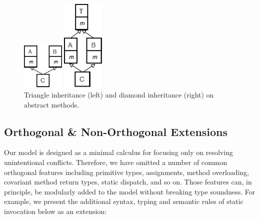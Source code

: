 \begin{figure}[t]
    \centering
    \begin{minipage}[t]{0.45\textwidth}
        \centering
        \includegraphics[width=2cm]{pics/P7.pdf}
    \end{minipage}
    \centering
    \hspace*{2pt}
    \begin{minipage}[t]{0.45\textwidth}
        \centering
        \includegraphics[width=2cm]{pics/P8.pdf}
    \end{minipage}  
    \caption{Triangle inheritance (left) and diamond inheritance (right) on abstract methods.}\label{fig:abstractdiamond}
\end{figure}

\subsection{Orthogonal \& Non-Orthogonal Extensions}\label{sec:orthoext}

Our model is designed as a minimal calculus for focusing only on resolving unintentional conflicts. Therefore, we have omitted a number of
common orthogonal features including primitive types, assignments, method overloading, covariant method return types, static dispatch, and so on.
Those features can, in principle, be modularly added to the model without breaking type soundness. For example, we present the additional syntax, typing and semantic rules of static invocation below as an extension:

